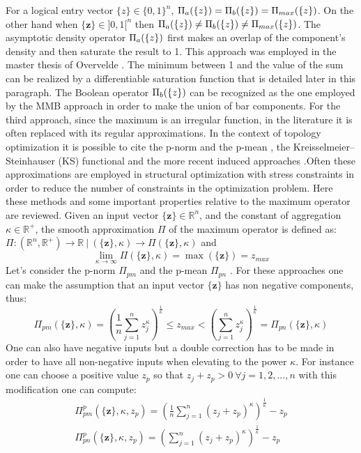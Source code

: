 For a logical entry vector  $\lbrace{z}\rbrace\in \{0,1\}^n$, $\Pi_a(\left\{{z}\right\})=\Pi_b(\left\{{z}\right\})=  \Pi_{max}(\left\{{z}\right\})$. On the other hand when $\lbrace \mathbf{z}\rbrace \in ]0,1[^n$ then
$\Pi_a(\left\{{z}\right\})\neq\Pi_b(\left\{{z}\right\}) \neq  \Pi_{max}(\left\{{z}\right\})$. The asymptotic density operator $\Pi_a(\left\{{z}\right\})$ first makes an overlap of the component's density and then saturate the result to 1. This approach was employed in the master thesis of Overvelde \cite{overvelde2012moving}. The minimum between 1 and the value of the sum can be realized by a differentiable saturation function that is detailed later in this paragraph. The Boolean operator $\Pi_b(\left\{{z}\right\})$ can be recognized as the one employed by the MMB \cite{hoang2017topology} approach in order to make the union of bar components. For the third approach, since the maximum is an irregular function, in the literature it is often replaced with its regular approximations. In the context of topology optimization it is possible to cite the p-norm and the p-mean \cite{duysinx1998new}, the Kreisselmeier–Steinhauser (KS) functional \cite{kreisselmeier1980systematic} and the more recent induced approaches \cite{kennedy2015improved}.Often these approximations are employed in structural optimization with stress constraints in order to reduce the number of constraints in the optimization problem.
Here these methods and some important properties relative to the maximum operator are reviewed. Given an input vector $\lbrace \mathbf{z}\rbrace \in \mathbb{R}^n$, and the constant of aggregation $\kappa\in\mathbb{R}^+ $, the smooth approximation $\Pi$ of the maximum operator is defined as:
$\Pi: \left(\mathbb{R}^n,\mathbb{R}^{+} \right) \rightarrow \mathbb{R}\  | \  (\lbrace \mathbf{z}\rbrace,\kappa) \rightarrow \Pi(\lbrace \mathbf{z}\rbrace,\kappa)$  and
\begin{equation}
\label{eq:lp}
    \lim_{\kappa\to\infty}\Pi(\lbrace \mathbf{z}\rbrace,\kappa)=\max(\lbrace \mathbf{z}\rbrace)=z_{max}
\end{equation}
Let’s consider the p-norm $\Pi_{pm}$ and the p-mean $\Pi_{pn}$ \cite{duysinx1998new}.
For these approaches one can make the assumption that an input vector $\lbrace \mathbf{z}\rbrace$ has non negative components, thus:
\begin{equation}
    \Pi_{pm}(\lbrace \mathbf{z}\rbrace,\kappa)=\left(\frac{1}{n}\sum_{j=1}^n z_j^{\kappa}\right)^{\frac{1}{\kappa}}\leq z_{max} <\left(\sum_{j=1}^n z_j^{\kappa}\right)^{\frac{1}{\kappa}}=\Pi_{pn}(\lbrace \mathbf{z}\rbrace,\kappa)
\end{equation}
One can also have negative inputs but a double correction has to be made in order to have all non-negative inputs when elevating to the power $\kappa$. For instance one can choose a positive value $z_p$ so that $z_j+z_p>0\  \forall j=1,2,...,n$ with this modification one can compute: 
\begin{eqnarray}
   \Pi_{pm}^{p}(\lbrace \mathbf{z}\rbrace,\kappa,z_p)=\left(\frac{1}{n}\sum_{j=1}^n (z_j+z_p)^{\kappa}\right)^{\frac{1}{\kappa}}-z_p  \\
   \Pi_{pn}^{p}(\lbrace \mathbf{z}\rbrace,\kappa,z_p)=\left(\sum_{j=1}^n (z_j+z_p)^{\kappa}\right)^{\frac{1}{\kappa}}-z_p
\end{eqnarray}

